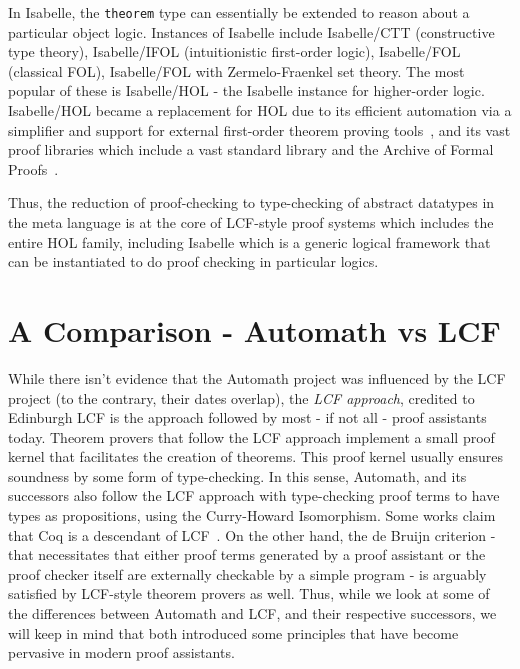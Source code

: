 \documentclass{article}
\begin{document}
	In Isabelle, the \texttt{theorem}
	type can essentially be extended to 
	reason about a particular object logic. 
	Instances of Isabelle include 
	Isabelle/CTT (constructive type theory),
	Isabelle/IFOL (intuitionistic first-order 
	logic), Isabelle/FOL (classical FOL), 
	Isabelle/FOL with Zermelo-Fraenkel 
	set theory. The most popular of these
	is Isabelle/HOL - the Isabelle
	instance for higher-order logic.
	Isabelle/HOL became a replacement for 
	HOL due to its efficient automation 
	via a simplifier and support for 
	external first-order theorem proving 
	tools~\cite
	{10.1007/978-3-540-25984-8_28}, and 
	its vast proof libraries which include 
	a vast standard library and the 
	Archive of Formal Proofs~\cite{afp}. 
	
	Thus, the reduction of proof-checking
	to type-checking of abstract datatypes
	in the meta language is at the core 
	of LCF-style proof systems which 
	includes the entire HOL family, 
	including Isabelle which is a 
	generic logical framework that 
	can be instantiated to do proof
	checking in particular logics.
	

\section{A Comparison - Automath vs LCF}
  	While there isn't evidence that the 
  	Automath project was influenced by 
  	the LCF project (to the contrary, 
  	their dates overlap), the 
  	\textit{LCF approach}, credited 
  	to Edinburgh LCF is the approach
  	followed by most - if not all - 
  	proof assistants today. 
  	Theorem provers that follow the 
  	LCF approach implement a small 
  	proof kernel that facilitates 
  	the creation of theorems. This 
  	proof kernel usually ensures 
  	soundness by some form of 
  	type-checking. In this sense, 
  	Automath, and its successors also 
  	follow the LCF approach with 
  	type-checking proof terms to have 
  	types as propositions, using the 
  	Curry-Howard Isomorphism. Some works 
  	claim that Coq is a descendant of 
  	LCF~\cite
  	{DBLP:journals/corr/abs-1907-02836}. 
  	On the other hand, the de Bruijn 
  	criterion - that necessitates 
  	that either proof terms generated 
  	by a proof assistant or the proof 
  	checker itself are externally 
  	checkable by a simple program - 
  	is arguably satisfied by LCF-style
  	theorem provers as well. Thus, 
  	while we look at some of the 
  	differences between Automath and 
  	LCF, and their respective successors, 
  	we will keep in mind that both 
  	introduced some principles that 
  	have become pervasive in modern 
  	proof assistants.
  	
\end{document}
